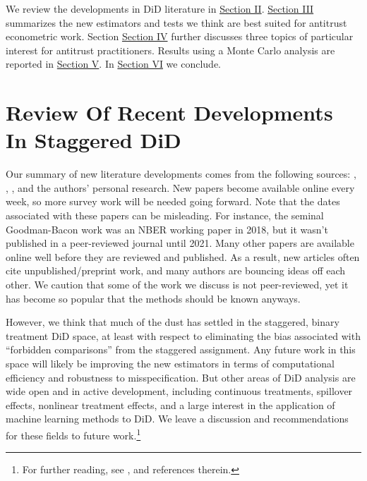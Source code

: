 \documentclass[12pt]{article}
\begin{document}
We review the developments in DiD literature in \hyperref[sec:literature]{Section II}. \hyperref[sec:analysis]{Section III} summarizes the new estimators and tests we think are best suited for antitrust econometric work. Section \hyperref[sec:antitrust]{Section IV} further discusses three topics of particular interest for antitrust practitioners. Results using a Monte Carlo analysis are reported in \hyperref[sec:analysis]{Section V}. In \hyperref[sec:conclusion]{Section VI} we conclude.

\section{Review Of Recent Developments In Staggered DiD} \label{sec:literature}
\begin{singlespace*}
\end{singlespace*}
\noindent Our summary of new literature developments comes from the following sources: \citet{baker2022much}, \citet{de2023two}, \citet{roth2023s}, and the authors’ personal research. New papers become available online every week, so more survey work will be needed going forward. Note that the dates associated with these papers can be misleading. For instance, the seminal Goodman-Bacon work was an NBER working paper in 2018,  but it wasn’t published in a peer-reviewed journal until 2021. Many other papers are available online well before they are reviewed and published. As a result, new articles often cite unpublished/preprint work, and many authors are bouncing ideas off each other. We caution that some of the work we discuss is not peer-reviewed, yet it has become so popular that the methods should be known anyways.

However, we think that much of the dust has settled in the staggered, binary treatment DiD space, at least with respect to eliminating the bias associated with “forbidden comparisons” from the staggered assignment. Any future work in this space will likely be improving the new estimators in terms of computational efficiency and robustness to misspecification. But other areas of DiD analysis are wide open and in active development, including continuous treatments, spillover effects, nonlinear treatment effects, and a large interest in the application of machine learning methods to DiD. We leave a discussion and recommendations for these fields to future work.\footnote{For further reading, see \citet{roth2023s}, \citet{de2023two} and references therein.}
\end{document}
